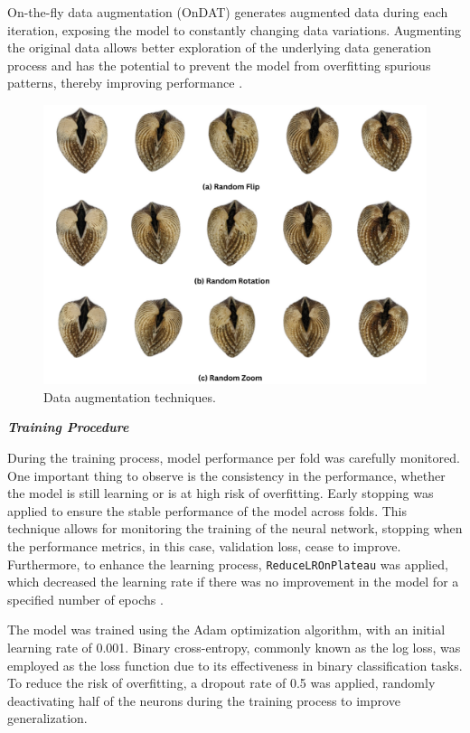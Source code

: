 On-the-fly data augmentation (OnDAT) generates augmented data during each iteration, exposing the model to constantly changing data variations. Augmenting the original data allows better exploration of the underlying data generation process and has the potential to prevent the model from overfitting spurious patterns, thereby improving performance \cite{cerqueira2024}.


\begin{figure}[h]
	\centering
	\includegraphics[width=\textwidth]{figures/data_augmentation.png}
	\caption{Data augmentation techniques.}
	\label{fig:data_augmentation}
\end{figure}

\newpage
\textbf{\textit{Training Procedure}}

During the training process, model performance per fold was carefully monitored. One important thing to observe is the consistency in the performance, whether the model is still learning or is at high risk of overfitting. Early stopping was applied to ensure the stable performance of the model across folds. This technique allows for monitoring the training of the neural network, stopping when the performance metrics, in this case, validation loss, cease to improve. Furthermore, to enhance the learning process, \texttt{ReduceLROnPlateau} was applied, which decreased the learning rate if there was no improvement in the model for a specified number of epochs \cite{kerasTeam}.

The model was trained using the Adam optimization algorithm, with an initial learning rate of 0.001. Binary cross-entropy, commonly known as the log loss, was employed as the loss function due to its effectiveness in binary classification tasks. To reduce the risk of overfitting, a dropout rate of 0.5 was applied, randomly deactivating half of the neurons during the training process to improve generalization.


